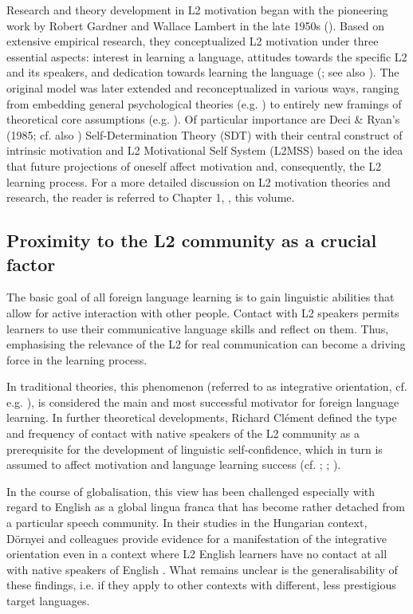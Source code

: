 \documentclass[output=paper]{langsci/langscibook}
\begin{document}
Research and theory development in L2 motivation began with the pioneering work by Robert Gardner and Wallace Lambert in the late 1950s (\citealt{GardnerLambert1959}). Based on extensive empirical research, they conceptualized L2 motivation under three essential aspects: interest in learning a language, attitudes towards the specific L2 and its speakers, and dedication towards learning the language (\citealt{GardnerLambert1959}; see also \citealt{Gardner1985}). The original model was later extended and reconceptualized in various ways, ranging from embedding general psychological theories (e.g. \citealt{Noels2001}) to entirely new framings of theoretical core assumptions (e.g. \citealt{Doernyei2005}). Of particular importance are Deci \& Ryan’s (1985; cf. also \citealt{RyanDeci2002}) Self-Determination Theory (SDT) with their central construct of intrinsic motivation and  L2 Motivational Self System (L2MSS) based on the idea that future projections of oneself affect motivation and, consequently, the L2 learning process. For a more detailed discussion on L2 motivation theories and research, the reader is referred to Chapter 1, , this volume.

\subsection{\label{bkm:Ref34897373}Proximity to the L2 community as a crucial factor}

The basic goal of all foreign language learning is to gain linguistic abilities that allow for active interaction with other people. Contact with L2 speakers permits learners to use their communicative language skills and reflect on them. Thus, emphasising the relevance of the L2 for real communication can become a driving force in the learning process.

In traditional theories, this phenomenon (referred to as integrative orientation, cf. e.g. \citealt{Gardner1985}), is considered the main and most successful motivator for foreign language learning. In further theoretical developments, Richard Clément defined the type and frequency of contact with native speakers of the L2 community as a prerequisite for the development of linguistic self-confidence, which in turn is assumed to affect motivation and language learning success (cf. \citealt{Clement1980}; \citealt{ClementKruidenier1985}; \citealt{SampasivamClement2014}). 

In the course of globalisation, this view has been challenged especially with regard to English as a global lingua franca that has become rather detached from a particular speech community. In their studies in the Hungarian context, Dörnyei and colleagues provide evidence for a manifestation of the integrative orientation even in a context where L2 English learners have no contact at all with native speakers of English \citep{DoernyeiEtAl2006}. What remains unclear is the generalisability of these findings, i.e. if they apply to other contexts with different, less prestigious target languages.
\end{document}
